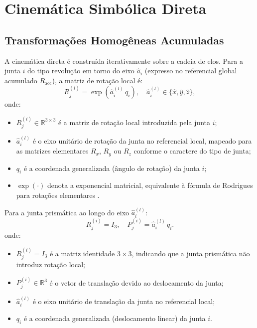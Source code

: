 \section{Cinemática Simbólica Direta}
\label{sec:cinematica_simbolica}

\subsection{Transformações Homogêneas Acumuladas}

A cinemática direta é construída iterativamente sobre a cadeia de elos. Para a junta $i$ do tipo revolução em torno do eixo $\hat{a}_i$ (expresso no referencial global acumulado $R_{\text{acc}}$), a matriz de rotação local é:
\begin{equation}
    R_j^{(i)} = \exp\!\left(\hat{a}_i^{(l)}\,q_i\right), \quad \hat{a}_i^{(l)} \in \{\hat{x}, \hat{y}, \hat{z}\},
    \label{eq:rot_local}
\end{equation}
onde:
\begin{itemize}
    \item $R_j^{(i)} \in \mathbb{R}^{3\times 3}$ é a matriz de rotação local introduzida pela junta $i$;
    \item $\hat{a}_i^{(l)}$ é o eixo unitário de rotação da junta no referencial local, mapeado para as matrizes elementares $R_x$, $R_y$ ou $R_z$ conforme o caractere do tipo de junta;
    \item $q_i$ é a coordenada generalizada (ângulo de rotação) da junta $i$;
    \item $\exp(\cdot)$ denota a exponencial matricial, equivalente à fórmula de Rodrigues para rotações elementares \cite{craig1989introduction, siciliano2009robotics}.
\end{itemize}

Para a junta prismática ao longo do eixo $\hat{a}_i^{(l)}$:
\begin{equation}
    R_j^{(i)} = I_3, \quad P_j^{(i)} = \hat{a}_i^{(l)}\, q_i.
    \label{eq:prism_local}
\end{equation}
onde:
\begin{itemize}
    \item $R_j^{(i)} = I_3$ é a matriz identidade $3\times 3$, indicando que a junta prismática não introduz rotação local;
    \item $P_j^{(i)} \in \mathbb{R}^{3}$ é o vetor de translação devido ao deslocamento da junta;
    \item $\hat{a}_i^{(l)}$ é o eixo unitário de translação da junta no referencial local;
    \item $q_i$ é a coordenada generalizada (deslocamento linear) da junta $i$.
\end{itemize}

